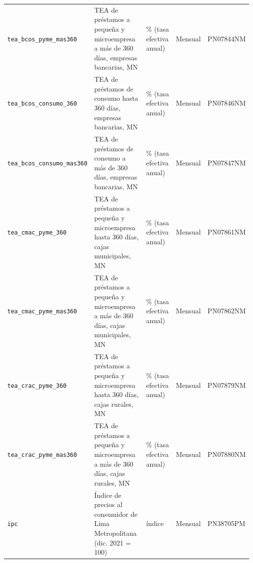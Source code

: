 {\begin{longtable}{@{}>{\RaggedRight\arraybackslash}p{4.0cm}>{\RaggedRight\arraybackslash}p{6.0cm}>{\RaggedRight\arraybackslash}p{2.3cm}>{\RaggedRight\arraybackslash}p{1.7cm}>{\RaggedRight\arraybackslash}p{1.9cm}@{}}
\texttt{tea\_\allowbreak{}bcos\_\allowbreak{}pyme\_\allowbreak{}mas360} & TEA de préstamos a pequeña y microempresa a más de 360 días, empresas bancarias, MN & \% (tasa efectiva anual) & Mensual & PN07844NM \\
\texttt{tea\_\allowbreak{}bcos\_\allowbreak{}consumo\_\allowbreak{}360} & TEA de préstamos de consumo hasta 360 días, empresas bancarias, MN & \% (tasa efectiva anual) & Mensual & PN07846NM \\
\texttt{tea\_\allowbreak{}bcos\_\allowbreak{}consumo\_\allowbreak{}mas360} & TEA de préstamos de consumo a más de 360 días, empresas bancarias, MN & \% (tasa efectiva anual) & Mensual & PN07847NM \\
\texttt{tea\_\allowbreak{}cmac\_\allowbreak{}pyme\_\allowbreak{}360} & TEA de préstamos a pequeña y microempresa hasta 360 días, cajas municipales, MN & \% (tasa efectiva anual) & Mensual & PN07861NM \\
\texttt{tea\_\allowbreak{}cmac\_\allowbreak{}pyme\_\allowbreak{}mas360} & TEA de préstamos a pequeña y microempresa a más de 360 días, cajas municipales, MN & \% (tasa efectiva anual) & Mensual & PN07862NM \\
\texttt{tea\_\allowbreak{}crac\_\allowbreak{}pyme\_\allowbreak{}360} & TEA de préstamos a pequeña y microempresa hasta 360 días, cajas rurales, MN & \% (tasa efectiva anual) & Mensual & PN07879NM \\
\texttt{tea\_\allowbreak{}crac\_\allowbreak{}pyme\_\allowbreak{}mas360} & TEA de préstamos a pequeña y microempresa a más de 360 días, cajas rurales, MN & \% (tasa efectiva anual) & Mensual & PN07880NM \\
\texttt{ipc} & Índice de precios al consumidor de Lima Metropolitana (dic. 2021 = 100) & índice & Mensual & PN38705PM \\
\bottomrule
\end{longtable}
}
